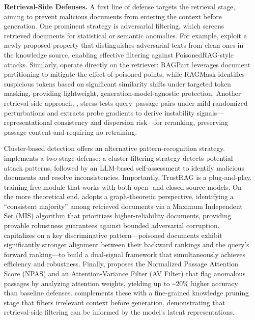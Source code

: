 \documentclass[11pt]{article}
\begin{document}
\textbf{Retrieval-Side Defenses.} A first line of defense targets the retrieval stage, aiming to prevent malicious documents from entering the context before generation. One prominent strategy is adversarial filtering, which screens retrieved documents for statistical or semantic anomalies. For example, \cite{ref442} exploit a newly proposed property that distinguishes adversarial texts from clean ones in the knowledge source, enabling effective filtering against PoisonedRAG-style attacks. Similarly, \cite{ref443} operate directly on the retriever: RAGPart leverages document partitioning to mitigate the effect of poisoned points, while RAGMask identifies suspicious tokens based on significant similarity shifts under targeted token masking, providing lightweight, generation-model-agnostic protection. Another retrieval-side approach, \cite{ref444}, stress-tests query--passage pairs under mild randomized perturbations and extracts probe gradients to derive instability signals---representational consistency and dispersion risk---for reranking, preserving passage content and requiring no retraining.

Cluster-based detection offers an alternative pattern-recognition strategy. \cite{ref445} implements a two-stage defense: a cluster filtering strategy detects potential attack patterns, followed by an LLM-based self-assessment to identify malicious documents and resolve inconsistencies. Importantly, TrustRAG is a plug-and-play, training-free module that works with both open- and closed-source models. On the more theoretical end, \cite{ref446} adopts a graph-theoretic perspective, identifying a ``consistent majority'' among retrieved documents via a Maximum Independent Set (MIS) algorithm that prioritizes higher-reliability documents, providing provable robustness guarantees against bounded adversarial corruption. \cite{ref447} capitalizes on a key discriminative pattern---poisoned documents exhibit significantly stronger alignment between their backward rankings and the query's forward ranking---to build a dual-signal framework that simultaneously achieves efficiency and robustness. Finally, \cite{ref448} proposes the Normalized Passage Attention Score (NPAS) and an Attention-Variance Filter (AV Filter) that flag anomalous passages by analyzing attention weights, yielding up to \textasciitilde20\% higher accuracy than baseline defenses. \cite{ref185} complements these with a fine-grained knowledge pruning stage that filters irrelevant context before generation, demonstrating that retrieval-side filtering can be informed by the model's latent representations.
\end{document}
